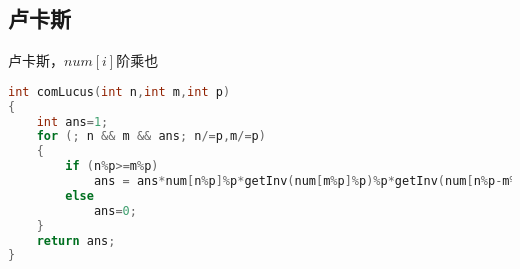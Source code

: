 \subsection{卢卡斯}
    卢卡斯，$num[i]$阶乘也
    \begin{lstlisting}[language=c++]
int comLucus(int n,int m,int p)
{
    int ans=1;
    for (; n && m && ans; n/=p,m/=p)
    {
        if (n%p>=m%p)
            ans = ans*num[n%p]%p*getInv(num[m%p]%p)%p*getInv(num[n%p-m%p])%p;
        else
            ans=0;
    }
    return ans;
}
    \end{lstlisting}
